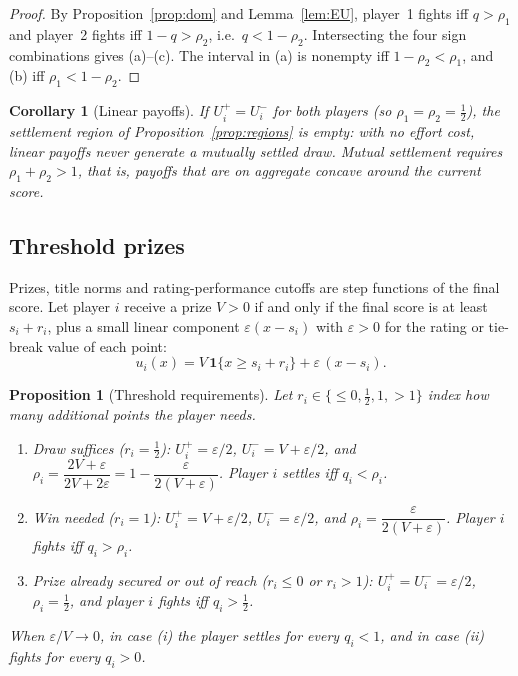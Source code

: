 \documentclass[11pt]{article}
\newtheorem{proposition}{Proposition}
\newtheorem{corollary}{Corollary}
\theoremstyle{definition}
\begin{document}
\begin{proof}
By Proposition~\ref{prop:dom} and Lemma~\ref{lem:EU}, player~1 fights iff
$q>\rho_1$ and player~2 fights iff $1-q>\rho_2$, i.e.\ $q<1-\rho_2$.
Intersecting the four sign combinations gives (a)--(c). The interval in (a) is
nonempty iff $1-\rho_2<\rho_1$, and (b) iff $\rho_1<1-\rho_2$.
\end{proof}

\begin{corollary}[Linear payoffs]\label{cor:linear}
If $U_i^{+}=U_i^{-}$ for both players (so $\rho_1=\rho_2=\tfrac12$), the
settlement region of Proposition~\ref{prop:regions} is empty: with no effort
cost, linear payoffs never generate a mutually settled draw. Mutual settlement
requires $\rho_1+\rho_2>1$, that is, payoffs that are on aggregate concave
around the current score.
\end{corollary}

\subsection{Threshold prizes}

Prizes, title norms and rating-performance cutoffs are step functions of
the final score. Let player $i$ receive a prize $V>0$ if and only if the final
score is at least $s_i+r_i$, plus a small linear component
$\varepsilon(x-s_i)$ with $\varepsilon>0$ for the rating or tie-break value of
each point:
\[
u_i(x)=V\,\mathbf 1\{x\ge s_i+r_i\}+\varepsilon\,(x-s_i).
\]

\begin{proposition}[Threshold requirements]\label{prop:threshold}
Let $r_i\in\{\le 0,\tfrac12,1,>1\}$ index how many additional points the player
needs.
\begin{enumerate}
\item[(i)] Draw suffices ($r_i=\tfrac12$): $U_i^{+}=\varepsilon/2$,
$U_i^{-}=V+\varepsilon/2$, and
$\rho_i=\dfrac{2V+\varepsilon}{2V+2\varepsilon}=1-\dfrac{\varepsilon}{2(V+\varepsilon)}$.
Player $i$ settles iff $q_i<\rho_i$.
\item[(ii)] Win needed ($r_i=1$): $U_i^{+}=V+\varepsilon/2$,
$U_i^{-}=\varepsilon/2$, and $\rho_i=\dfrac{\varepsilon}{2(V+\varepsilon)}$.
Player $i$ fights iff $q_i>\rho_i$.
\item[(iii)] Prize already secured or out of reach ($r_i\le0$ or $r_i>1$):
$U_i^{+}=U_i^{-}=\varepsilon/2$, $\rho_i=\tfrac12$, and player $i$ fights
iff $q_i>\tfrac12$.
\end{enumerate}
When $\varepsilon/V\to0$, in case (i) the player settles for every $q_i<1$,
and in case (ii) fights for every $q_i>0$.
\end{proposition}
\end{document}
